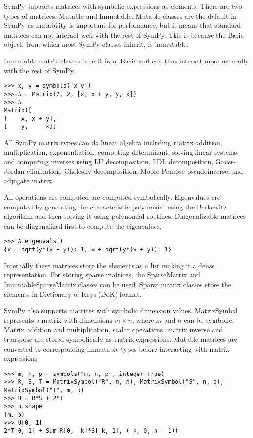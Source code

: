 SymPy supports matrices with symbolic expressions as elements. There are two
types of matrices, Mutable and Immutable. Mutable classes are the default in
SymPy as mutability is important for performance, but it means that standard
matrices can not interact well with the rest of SymPy. This is because the
Basic object, from which most SymPy classes inherit, is immutable.

Immutable matrix classes inherit from Basic and can thus interact more
naturally with the rest of SymPy.

\begin{verbatim}
>>> x, y = symbols('x y')
>>> A = Matrix(2, 2, [x, x + y, y, x])
>>> A
Matrix([
[    x, x + y],
[    y,     x]])
\end{verbatim}

All SymPy matrix types can do linear algebra including matrix addition,
multiplication, exponentiation, computing determinant, solving linear systems
and computing inverses using LU decomposition, LDL decomposition, Gauss-Jordan
elimination, Cholesky decomposition, Moore-Penrose pseudoinverse, and adjugate
matrix.

All operations are computed are computed symbolically. Eigenvalues are
computed by generating the characteristic polynomial using the Berkowitz
algorithm and then solving it using polynomial routines. Diagonalizable
matrices can be diagonalized first to compute the eigenvalues.

\begin{verbatim}
>>> A.eigenvals()
{x - sqrt(y*(x + y)): 1, x + sqrt(y*(x + y)): 1}
\end{verbatim}

Internally these matrices store the elements as a list making it a dense
representation. For storing sparse matrices, the SparseMatrix and
ImmutableSparseMatrix classes can be used. Sparse matrix classes store
the elements in Dictionary of Keys (DoK) format.

SymPy also supports matrices with symbolic dimension values. MatrixSymbol
represents a matrix with dimensions $m\times n$, where $m$ and $n$ can be
symbolic. Matrix addition and multiplication, scalar operations, matrix
inverse and transpose are stored symbolically as matrix expressions. Mutable
matrices are converted to corresponding immutable types before interacting
with matrix expressions

\begin{verbatim}
>>> m, n, p = symbols("m, n, p", integer=True)
>>> R, S, T = MatrixSymbol("R", m, n), MatrixSymbol("S", n, p), MatrixSymbol("t", m, p)
>>> U = R*S + 2*T
>>> u.shape
(m, p)
>>> U[0, 1]
2*T[0, 1] + Sum(R[0, _k]*S[_k, 1], (_k, 0, n - 1))
\end{verbatim}

